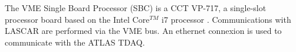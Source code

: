 The VME Single Board Processor (SBC) is a CCT VP-717, a single-slot processor board based on the Intel Core$^{TM}$ i7 processor \cite{ref:vmesbc}. Communications with LASCAR are performed via the VME bus. An ethernet connexion is used to communicate with the ATLAS TDAQ. 

